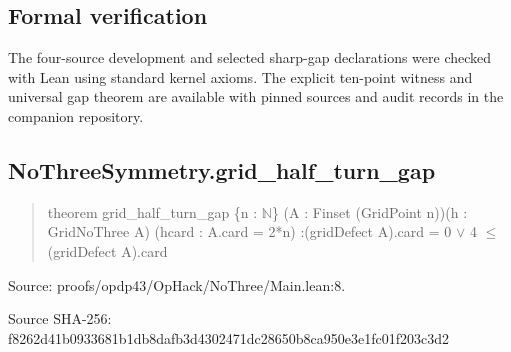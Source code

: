 \documentclass[11pt,a4paper]{article}
\begin{document}
\subsection{Formal verification}
The four-source development and selected sharp-gap declarations were checked with Lean using standard kernel axioms. The explicit ten-point witness and universal gap theorem are available with pinned sources and audit records in the companion repository.

\begin{samepage}
\subsection{NoThreeSymmetry.grid\_half\_turn\_gap}
\begin{quote}\small\ttfamily theorem grid\_half\_turn\_gap \{n : \ensuremath{\mathbb{N}}\} (A : Finset (GridPoint n))\newline     (h : GridNoThree A) (hcard : A.card = 2*n) :\newline     (gridDefect A).card = 0 \ensuremath{\vee} 4 \ensuremath{\leq} (gridDefect A).card\end{quote}
{\small Source: proofs/opdp43/OpHack/NoThree/Main.lean:8.\par}

{\small Source SHA-256: f8262d41b0933681b1db8dafb3d4302471dc28650b8ca950e3e1fc01f203c3d2\par}

\end{samepage}
\end{document}
